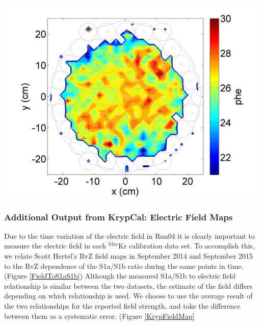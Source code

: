 \documentclass[a4paper,12pt]{article}
\begin{document}
{\begin{center}
\includegraphics[scale=0.5]{Run04Corrections/SEXYSizeExample.png}
 \label{SESize2}
\end{center}

\subsubsection{Additional Output from KrypCal: Electric Field Maps}

Due to the time variation of the electric field in Run04 it is clearly important to measure the electric field in each $^{83m}$Kr calibration data set.  To accomplish this, we relate Scott Hertel's RvZ field maps in September 2014 and September 2015 to the RvZ dependence of the S1a/S1b ratio during the same points in time.  (Figure \ref{FieldToS1aS1b}) Although the measured S1a/S1b to electric field relationship is similar between the two datasets, the estimate of the field differs depending on which relationship is used.  We choose to use the average result of the two relationships for the reported field strength, and take the difference between them as a systematic error. (Figure \ref{KrypFieldMap}

}
\end{document}
